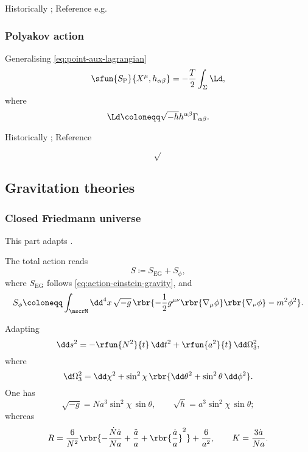 \documentclass[a4paper,11pt]{article}
\begin{document}
Historically \cite{Nambu1970,Goto1971}; Reference e.g.\ 
\cite{Blumenhagen2013}
\cite[sec.\ 3.2]{Kiefer2012}

\subsubsection*{Polyakov action}

Generalising \eqref{eq:point-aux-lagrangian}
\begin{equation}
\sfun{S_\text{P}}{X^\mu, h_{\alpha\beta}} = -\frac{T}{2}\int_\Sigma \Ld,
\end{equation}
where
\begin{equation}
\Ld \coloneqq \sqrt{-h} h^{\alpha\beta}\Gamma_{\alpha\beta}.
\end{equation}



Historically \cite{Brink1976,Deser1976,Polyakov1981};
Reference
\cite[sec.\ 3.2]{Kiefer2012}


\begin{equation}
\sqrt{}
\end{equation}



\subsection{Gravitation theories}

\subsubsection*{Closed Friedmann universe}
This part adapts \cite[sec.\ 8.1.2]{Kiefer2012}.

The total action reads
\begin{equation}
S \coloneqq S_\text{EG} + S_\phi,
\end{equation}
where $S_\text{EG}$ follows \eqref{eq:action-einstein-gravity}, and
\begin{equation}
S_\phi \coloneqq \int_\mscrM\dd^4 x\, \sqrt{-g}\,
\rbr{-\frac{1}{2} g^{\mu\nu} \rbr{\nabla_\mu\phi} \rbr{\nabla_\nu\phi}
-m^2\phi^2}.
\end{equation}

Adapting
\begin{equation}
\dd s^2 = -\rfun{N^2}{t}\,\dd t^2 + \rfun{a^2}{t}\,\dd\Omega_3^2,
\end{equation}
where
\begin{equation}
\d\Omega_3^2 = \dd\chi^2+\sin^2\chi\,\rbr{\dd\theta^2+\sin^2\theta\,\dd\phi^2}.
\end{equation}
One has
\begin{equation}
\sqrt{-g} = N a^3 \sin^2\chi\,\sin\theta,\qquad
\sqrt{h} = a^3\sin^2\chi\,\sin\theta;
\end{equation}
whereas
\begin{equation}
R = \frac{6}{N^2}\rbr{-\frac{\dot{N}\dot{a}}{Na} + \frac{\ddot{a}}{a} + 
\rbr{\frac{\dot{a}}{a}}^2} + \frac{6}{a^2},\qquad
K = \frac{3\dot{a}}{Na}.
\end{equation}
\end{document}
